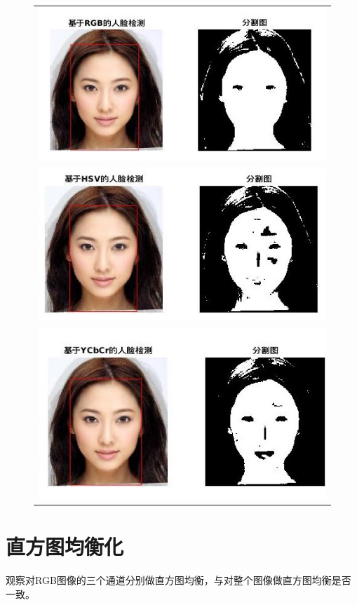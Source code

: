 \documentclass[logo,reportComp]{thesis}
\begin{document}
\begin{figure}[H]
\centering
\begin{tabular}{c}
\includegraphics[width=0.8\linewidth]{fig/test21.jpg}\\
\includegraphics[width=0.8\linewidth]{fig/test22.jpg}\\
\includegraphics[width=0.8\linewidth]{fig/test23.jpg}
\end{tabular}
\end{figure}


\section{直方图均衡化}
观察对RGB图像的三个通道分别做直方图均衡，与对整个图像做直方图均衡是否一致。
\end{document}
